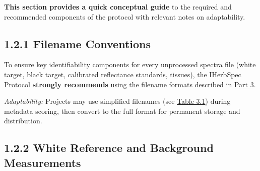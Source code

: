 \documentclass[
  letterpaper,
  DIV=11,
  numbers=noendperiod]{scrreprt}
\begin{document}
\textbf{This section provides a quick conceptual guide} to the required
and recommended components of the protocol with relevant notes on
adaptability.

\subsection{1.2.1 Filename Conventions}\label{filename-conventions}

To ensure key identifiability components for every unprocessed spectra
file (white target, black target, calibrated reflectance standards,
tissues), the IHerbSpec Protocol \textbf{strongly recommends} using the
filename formats described in \href{part3-filenames.qmd}{Part 3}.

\emph{Adaptability:} Projects may use simplified filenames (see
\hyperref[tbl-3-1]{Table 3.1}) during metadata scoring, then convert to
the full format for permanent storage and distribution.

\subsection{1.2.2 White Reference and Background
Measurements}\label{white-reference-and-background-measurements}
\end{document}
